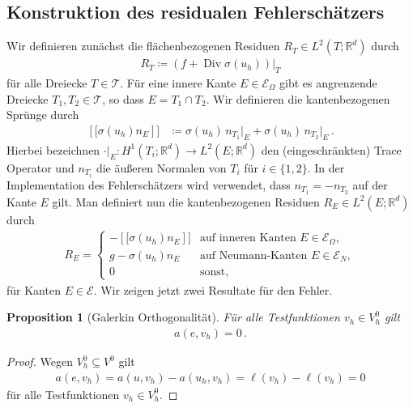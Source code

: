 \documentclass{scrartcl}
\newcounter{everything}
\newtheorem{proposition}[everything]{Proposition}
\def\R{\mathbb{R}}
\newcommand{\cE}{\mathcal{E}}
\newcommand{\cT}{\mathcal{T}}
\DeclareMathOperator{\diver}{Div}			%
\begin{document}
\subsection{Konstruktion des residualen Fehlerschätzers}
Wir definieren zunächst die flächenbezogenen Residuen $R_T\in L^2(T;\R^d)$ durch
\begin{align}
	R_T\coloneqq \left(f+\diver \sigma(u_h)\right)\big\vert_{T}
	\label{eq:DefinitionRT}
\end{align}
für alle Dreiecke $T\in\cT$. Für eine innere Kante $E\in\cE_\Omega$ gibt es angrenzende Dreiecke $T_1,T_2\in\cT$, so dass $E=T_1\cap T_2$.
Wir definieren die kantenbezogenen Sprünge durch
\begin{align*}
	\left[\![\sigma(u_h) n_E\right]\!]
	&\coloneqq\sigma(u_h) \,n_{T_1}\big\vert_{E}+\sigma(u_h)\, n_{T_2} \big\vert_{E}\,.
\end{align*}
Hierbei bezeichnen $\cdot\vert_{E}\colon H^1(T_i;\R^d)\to L^2(E;\R^d)$ den (eingeschränkten) Trace Operator und $n_{T_i}$ die äußeren Normalen von $T_i$ für $i\in\{1,2\}$. In der Implementation des Fehler\-schätzers wird verwendet, dass $n_{T_1}=-n_{T_2}$ auf der Kante $E$ gilt.
Man definiert nun die kantenbezogenen Residuen $R_E\in L^2(E;\R^d)$ durch
\begin{align}
	R_E = \begin{cases}
		-\left[\![\sigma(u_h) n_E\right]\!] &\text{auf inneren Kanten }E\in\cE_\Omega, \\
		g-\sigma(u_h) n_E &\text{auf Neumann-Kanten }E\in\cE_N, \\
		0 &\text{sonst},
	\end{cases}
	\label{eq:DefinitionRE}
\end{align}
für Kanten $E\in\cE$.
Wir zeigen jetzt zwei Resultate für den Fehler.
\begin{proposition}[Galerkin Orthogonalität]
	Für alle Testfunktionen $v_h\in V_h^0$ gilt
	\begin{align*}
		a(e,v_h) = 0\,.
	\end{align*}
\end{proposition}
\begin{proof}
	Wegen $V_h^0\subseteq V^0$ gilt
	\begin{align*}
		a(e,v_h) = a(u,v_h)-a(u_h,v_h) = \ell(v_h)-\ell(v_h) = 0
	\end{align*}
	für alle Testfunktionen $v_h\in V_h^0$.
\end{proof}
\end{document}
